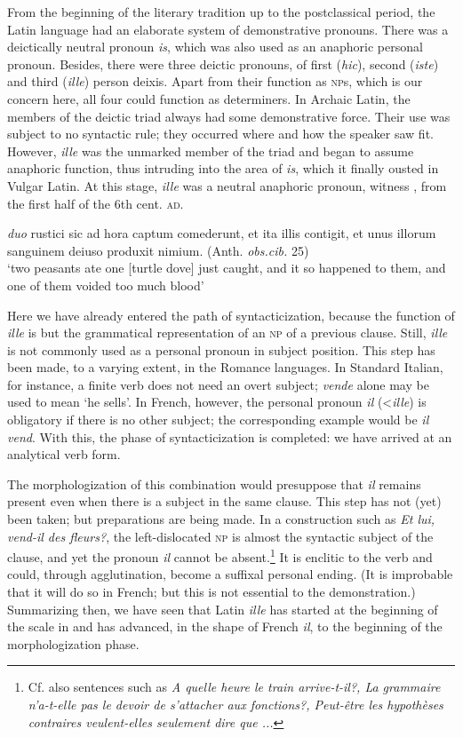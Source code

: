 From the beginning of the literary tradition up to the postclassical period, the Latin language had an elaborate system of demonstrative pronouns. There was a deictically neutral pronoun \textit{is}, which was also used as an anaphoric personal pronoun. Besides, there were three deictic pronouns, of first (\textit{hic}), second (\textit{iste}) and third (\textit{ille}) person deixis. Apart from their function as \textsc{np}s, which is our concern here, all four could function as determiners. In Archaic Latin, the members of the deictic triad always had some demonstrative force. Their use was subject to no syntactic rule; they occurred where and how the speaker saw fit. However, \textit{ille} was the unmarked member of the triad and began to assume anaphoric function, thus intruding into the area of \textit{is}, which it finally ousted in Vulgar Latin. At this stage, \textit{ille} was a neutral anaphoric pronoun, witness , from the first half of the 6th cent. \textsc{ad}.

\ea\label{ex:E1}
 \textit{duo} rustici sic ad hora captum comederunt, et ita illis contigit, et unus illorum sanguinem deiuso produxit nimium.  (Anth. \textit{obs.cib.} 25)\\
\glt ‘two peasants ate one [turtle dove] just caught, and it so happened to them, and one of them voided too much blood’ \\
\z

Here we have already entered the path of syntacticization, because the function of \textit{ille} is but the grammatical representation of an \textsc{np} of a previous clause. Still, \textit{ille} is not commonly used as a personal pronoun in subject position. This step has been made, to a varying extent, in the Romance languages. In Standard Italian, for instance, a finite verb does not need an overt subject; \textit{vende} alone may be used to mean ‘he sells’. In French, however, the personal pronoun \textit{il} ({\textless}\textit{ille}) is obligatory if there is no other subject; the corresponding example would be \textit{il vend}. With this, the phase of syntacticization is completed: we have arrived at an analytical verb form.

The morphologization of this combination would presuppose that \textit{il} remains present even when there is a subject in the same clause. This step has not (yet) been taken; but preparations are being made. In a construction such as \textit{Et lui, vend-il des fleurs?}, the left-dislocated \textsc{np} is almost the syntactic subject of the clause, and yet the pronoun \textit{il} cannot be absent.\footnote{Cf. also sentences such as \textit{A quelle heure le train arrive-t-il?, La grammaire n'a-t-elle pas le devoir de s'attacher aux fonctions?, Peut-être les hypothèses contraires veulent-elles seulement dire que ...}} It is enclitic to the verb and could, through agglutination, become a suffixal personal ending. (It is improbable that it will do so in French; but this is not essential to the demonstration.) Summarizing then, we have seen that Latin \textit{ille} has started at the beginning of the scale in  and has advanced, in the shape of French \textit{il}, to the beginning of the morphologization phase.


